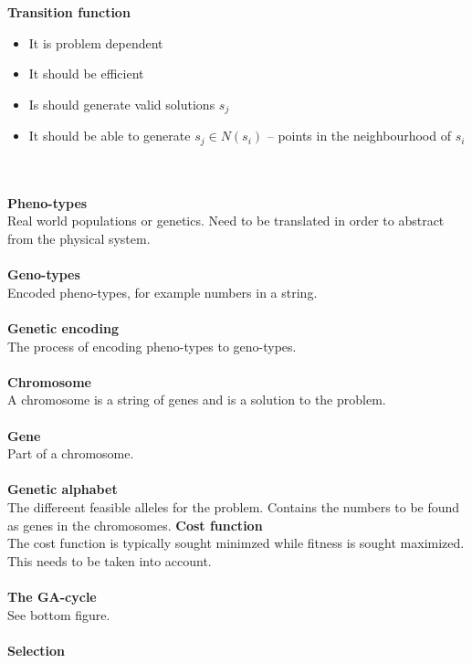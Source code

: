 \documentclass[12pt,a4paper]{report}
\begin{document}
\textbf{Transition function}
\begin{itemize}
\item It is problem dependent
\item It should be efficient
\item Is should generate valid solutions $s_j$
\item It should be able to generate $s_j\in N(s_i)$ -- points in the neighbourhood of $s_i$
\end{itemize}
\clearpage
{}\\\\
\textbf{Pheno-types}\\
Real world populations or genetics. Need to be translated in order to abstract from the physical system.\\\\
\textbf{Geno-types}\\
Encoded pheno-types, for example numbers in a string.\\\\
\textbf{Genetic encoding}\\
The process of encoding pheno-types to geno-types.\\\\
\textbf{Chromosome}\\
A chromosome is a string of genes and is a solution to the problem.\\\\
\textbf{Gene}\\
Part of a chromosome.\\\\
\textbf{Genetic alphabet}\\
The differeent feasible alleles for the problem. Contains the numbers to be found as genes in the chromosomes.
\textbf{Cost function}\\
The cost function is typically sought minimzed while fitness is sought maximized. This needs to be taken into account.\\\\
\textbf{The GA-cycle}\\
See bottom figure.\\\\
\textbf{Selection}
\end{document}
